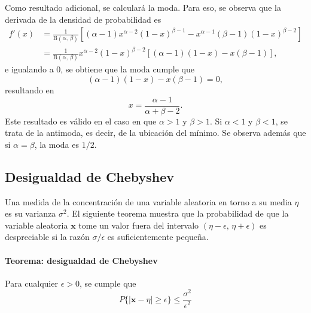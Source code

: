 \documentclass[a4paper]{report}
\newcommand{\x}{\mathbf{x}}
\begin{document}
Como resultado adicional, se calculará la moda. Para eso, se observa que la derivada de la densidad de probabilidad es
\begin{align*}
 f'(x)&=\frac{1}{\mathrm{B}(\alpha,\,\beta)}\left[(\alpha-1)x^{\alpha-2}(1-x)^{\beta-1}
    -x^{\alpha-1}(\beta-1)(1-x)^{\beta-2}\right]\\
    &=\frac{1}{\mathrm{B}(\alpha,\,\beta)}x^{\alpha-2}(1-x)^{\beta-2}\left[(\alpha-1)(1-x)-x(\beta-1)\right],
\end{align*}
e igualando a 0, se obtiene que la moda cumple que
\[
 (\alpha-1)(1-x)-x(\beta-1)=0,
\]
resultando en 
\begin{equation}\label{eq:beta_distibution_mode}
 x=\frac{\alpha-1}{\alpha+\beta-2}.
\end{equation}
Este resultado es válido en el caso en que \(\alpha>1\) y \(\beta>1\). Si \(\alpha<1\) y \(\beta<1\), se trata de la antimoda, es decir, de la ubicación del mínimo. Se observa además que si \(\alpha=\beta\), la moda es \(1/2\).

\subsection{Desigualdad de Chebyshev}

Una medida de la concentración de una variable aleatoria en torno a su media \(\eta\) es su varianza \(\sigma^2\). El siguiente teorema muestra que la probabilidad de que la variable aleatoria \(\x\) tome un valor fuera del intervalo \((\eta-\epsilon,\,\eta+\epsilon)\) es despreciable si la razón \(\sigma/\epsilon\) es suficientemente pequeña.

\paragraph{Teorema: desigualdad de Chebyshev} Para cualquier \(\epsilon>0\), se cumple que
\begin{equation}\label{eq:chebyshev_inequality}
 P\{|\x-\eta|\geq\epsilon\}\leq \frac{\sigma^2}{\epsilon^2}
\end{equation}
\end{document}

